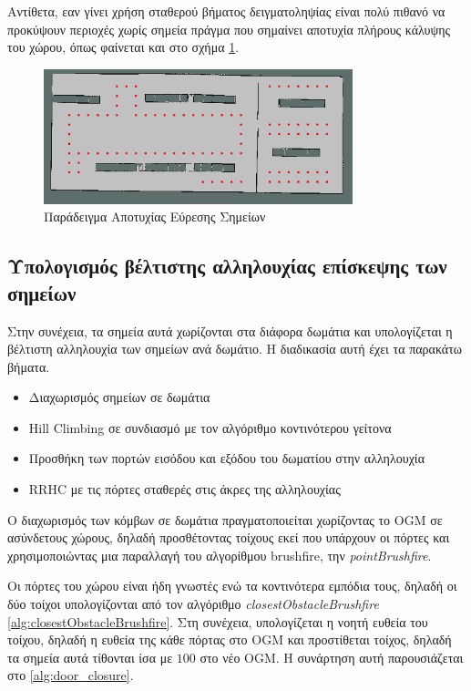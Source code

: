 Αντίθετα, εαν γίνει χρήση σταθερού βήματος δειγματοληψίας είναι πολύ πιθανό να προκύψουν περιοχές χωρίς σημεία πράγμα που σημαίνει αποτυχία πλήρους κάλυψης του χώρου, όπως φαίνεται και στο σχήμα \ref{fig:wrong_sampling_example}.


\begin{figure}[!htb]
    \centering
    \includegraphics[width=0.8\textwidth]{./images/chapter5/range_2_get_only_in_second_half.png}
    \caption{Παράδειγμα Αποτυχίας Εύρεσης Σημείων}
    \label{fig:wrong_sampling_example}
\end{figure}




\subsection{Υπολογισμός βέλτιστης αλληλουχίας επίσκεψης των σημείων}
\label{subsection:node_sequence_optimization}

Στην συνέχεια, τα σημεία αυτά χωρίζονται στα διάφορα δωμάτια και υπολογίζεται η βέλτιστη αλληλουχία των σημείων ανά δωμάτιο. Η διαδικασία αυτή έχει τα παρακάτω βήματα.

\begin{itemize}
    \setlength\itemsep{-0.2em}
    \item Διαχωρισμός σημείων σε δωμάτια
    \item Hill Climbing σε συνδιασμό με τον αλγόριθμο κοντινότερου γείτονα
    \item Προσθήκη των πορτών εισόδου και εξόδου του δωματίου στην αλληλουχία
    \item RRHC με τις πόρτες σταθερές στις άκρες της αλληλουχίας
\end{itemize}

Ο διαχωρισμός των κόμβων σε δωμάτια πραγματοποιείται χωρίζοντας το OGM σε ασύνδετους χώρους, δηλαδή προσθέτοντας τοίχους εκεί που υπάρχουν οι πόρτες και χρησιμοποιώντας μια παραλλαγή του αλγορίθμου brushfire, την \emph{pointBrushfire}. 

Οι πόρτες του χώρου είναι ήδη γνωστές ενώ τα κοντινότερα εμπόδια τους, δηλαδή οι δύο τοίχοι υπολογίζονται από τον αλγόριθμο \emph{closestObstacleBrushfire} \ref{alg:closestObstacleBrushfire}. Στη συνέχεια, υπολογίζεται η νοητή ευθεία του τοίχου, δηλαδή η ευθεία της κάθε πόρτας στο OGM και προστίθεται τοίχος, δηλαδή τα σημεία αυτά τίθονται ίσα με $100$ στο νέο OGM. Η συνάρτηση αυτή παρουσιάζεται στο \ref{alg:door_closure}.

